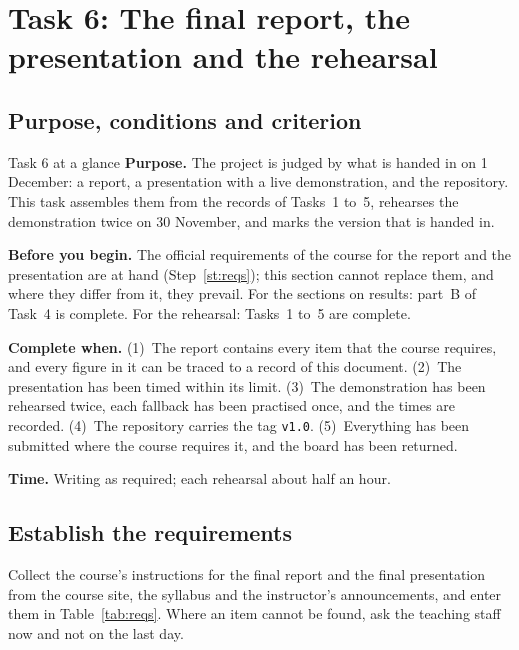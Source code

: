 \section{Task 6: The final report, the presentation and the rehearsal}
\label{sec:t6}

\subsection{Purpose, conditions and criterion}

\begin{plain}{Task 6 at a glance}
\textbf{Purpose.} The project is judged by what is handed in on 1 December: a report, a
presentation with a live demonstration, and the repository. This task assembles them from the
records of Tasks~1 to~5, rehearses the demonstration twice on 30 November, and marks the
version that is handed in.

\textbf{Before you begin.} The official requirements of the course for the report and the
presentation are at hand (Step~\ref{st:reqs}); this section cannot replace them, and where they
differ from it, they prevail. For the sections on results: part~B of Task~4 is complete. For
the rehearsal: Tasks~1 to~5 are complete.

\textbf{Complete when.} (1)~The report contains every item that the course requires, and every
figure in it can be traced to a record of this document. (2)~The presentation has been timed
within its limit. (3)~The demonstration has been rehearsed twice, each fallback has been
practised once, and the times are recorded. (4)~The repository carries the tag \texttt{v1.0}. (5)~Everything has
been submitted where the course requires it, and the board has been returned.

\textbf{Time.} Writing as required; each rehearsal about half an hour.
\end{plain}

\subsection{Establish the requirements}

\label{st:reqs}
Collect the course's instructions for the final report and the final presentation from the
course site, the syllabus and the instructor's announcements, and enter them in
Table~\ref{tab:reqs}. Where an item cannot be found, ask the teaching staff now and not on the
last day.


